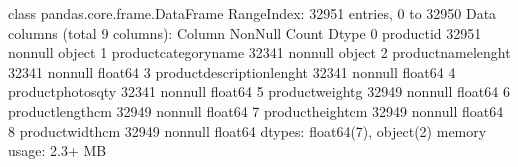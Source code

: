 \documentclass[letterpaper,10pt,english]{jupyterBook}
\begin{document}
\begin{sphinxVerbatim}[commandchars=\\\{\}]
\PYGZlt{}class \PYGZsq{}pandas.core.frame.DataFrame\PYGZsq{}\PYGZgt{}
RangeIndex: 32951 entries, 0 to 32950
Data columns (total 9 columns):
 \PYGZsh{}   Column                      Non\PYGZhy{}Null Count  Dtype  
\PYGZhy{}\PYGZhy{}\PYGZhy{}  \PYGZhy{}\PYGZhy{}\PYGZhy{}\PYGZhy{}\PYGZhy{}\PYGZhy{}                      \PYGZhy{}\PYGZhy{}\PYGZhy{}\PYGZhy{}\PYGZhy{}\PYGZhy{}\PYGZhy{}\PYGZhy{}\PYGZhy{}\PYGZhy{}\PYGZhy{}\PYGZhy{}\PYGZhy{}\PYGZhy{}  \PYGZhy{}\PYGZhy{}\PYGZhy{}\PYGZhy{}\PYGZhy{}  
 0   product\PYGZus{}id                  32951 non\PYGZhy{}null  object 
 1   product\PYGZus{}category\PYGZus{}name       32341 non\PYGZhy{}null  object 
 2   product\PYGZus{}name\PYGZus{}lenght         32341 non\PYGZhy{}null  float64
 3   product\PYGZus{}description\PYGZus{}lenght  32341 non\PYGZhy{}null  float64
 4   product\PYGZus{}photos\PYGZus{}qty          32341 non\PYGZhy{}null  float64
 5   product\PYGZus{}weight\PYGZus{}g            32949 non\PYGZhy{}null  float64
 6   product\PYGZus{}length\PYGZus{}cm           32949 non\PYGZhy{}null  float64
 7   product\PYGZus{}height\PYGZus{}cm           32949 non\PYGZhy{}null  float64
 8   product\PYGZus{}width\PYGZus{}cm            32949 non\PYGZhy{}null  float64
dtypes: float64(7), object(2)
memory usage: 2.3+ MB
\end{sphinxVerbatim}

\begin{sphinxVerbatim}[commandchars=\\\{\}]
\PYG{p}{[}\PYG{p}{]}  \PYG{p}{[}\PYG{p}{]}
\end{sphinxVerbatim}
\end{document}
